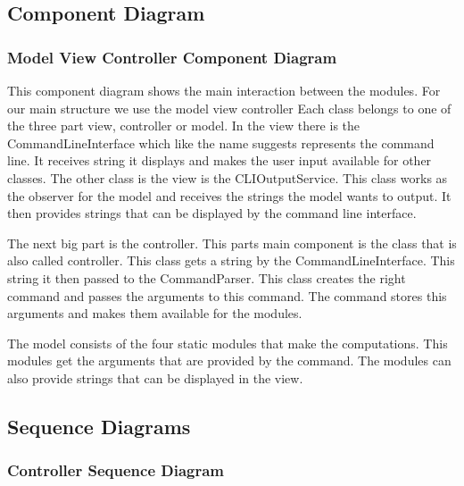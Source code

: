 \documentclass[parskip=full]{scrartcl}
\begin{document}
\subsection{Component Diagram}

\subsubsection{Model View Controller Component Diagram}



This component diagram shows the main interaction between the modules.
For our main structure we use the model view controller 
Each class belongs to one of the three part view, controller or model.
In the view there is the CommandLineInterface which like the name suggests represents the command line. 
It receives string it displays and makes the user input available for other classes.
The other class is the view is the CLIOutputService. 
This class works as the observer for the model and receives the strings the model wants to output.
It then provides strings that can be displayed by the command line interface.

The next big part is the controller.
This parts main component is the class that is also called controller.
This class gets a string by the CommandLineInterface.
This string it then passed to the CommandParser.
This class creates the right command and passes the arguments to this command.
The command stores this arguments and makes them available for the modules.

The model consists of the four static modules that make the computations.
This modules get the arguments that are provided by the command.
The modules can also provide strings that can be displayed in the view.

\subsection{Sequence Diagrams}

\subsubsection{Controller Sequence Diagram}


\end{document}
